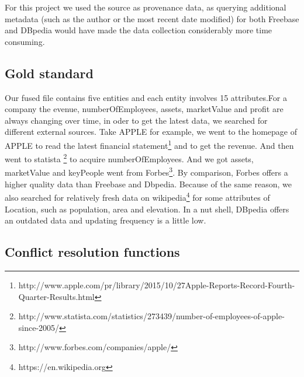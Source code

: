 
For this project we used the source as provenance data, as querying additional metadata (such as the author or the most recent date modified) for both Freebase and DBpedia would have made the data collection considerably more time consuming. 


\subsection{Gold standard}
Our fused file contains five entities and each entity involves 15 attributes.For a company the evenue, numberOfEmployees, assets, marketValue and profit are always changing over time, in oder to get the latest data, we searched for different external sources. Take APPLE for example, we went to the homepage of APPLE  to read the latest financial statement\footnote{http://www.apple.com/pr/library/2015/10/27Apple-Reports-Record-Fourth-Quarter-Results.html} and to get the revenue. And then went to statista \footnote{http://www.statista.com/statistics/273439/number-of-employees-of-apple-since-2005/} to acquire numberOfEmployees. And we got assets, marketValue and keyPeople went from Forbes\footnote{http://www.forbes.com/companies/apple/}. By comparison, Forbes offers a higher quality data than Freebase and Dbpedia. Because of the same reason, we also searched for relatively fresh data on wikipedia\footnote{https://en.wikipedia.org} for some attributes of Location, such as population, area and elevation. In a nut shell, DBpedia offers an outdated data and updating frequency is a little low.
 

\subsection{Conflict resolution functions}


